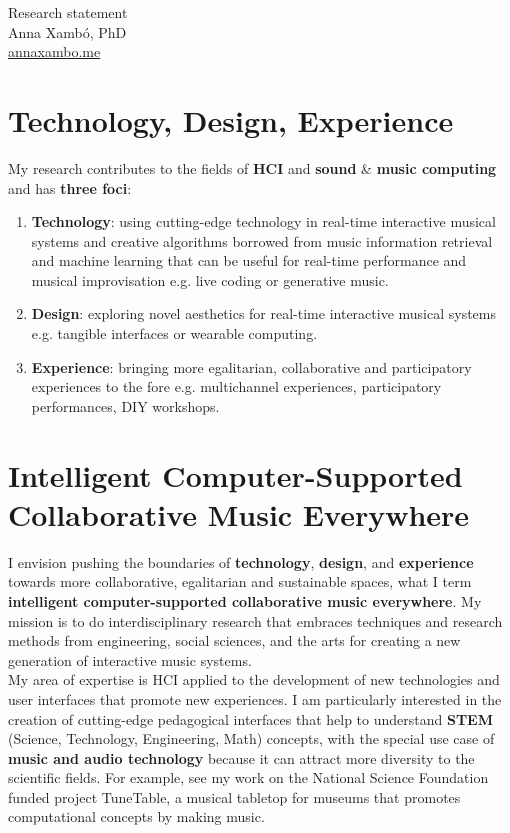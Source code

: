 \documentclass[10pt, a4paper]{article}
\begin{document}
{\LARGE Research statement}\\[0.2cm]
Anna Xambó, PhD\\
\href{http://annaxambo.me}{annaxambo.me}

\section*{Technology, Design, Experience}

My research contributes to the fields of \textbf{HCI} and \textbf{sound} \& \textbf{music computing} and has \textbf{three foci}:

\begin{enumerate}
\item \textbf{Technology}: using cutting-edge technology in real-time interactive musical systems and creative algorithms borrowed from music information retrieval and machine learning that can be useful for real-time performance and musical improvisation e.g. live coding or generative music.
\item \textbf{Design}: exploring novel aesthetics for real-time interactive musical systems e.g. tangible interfaces or wearable computing. 
\item \textbf{Experience}: bringing more egalitarian, collaborative and participatory experiences to the fore e.g. multichannel experiences, participatory performances, DIY workshops. 
\end{enumerate}

\section*{Intelligent Computer-Supported Collaborative Music Everywhere}

I envision pushing the boundaries of \textbf{technology}, \textbf{design}, and \textbf{experience} towards more collaborative, egalitarian and sustainable spaces, what I term \textbf{intelligent computer-supported collaborative music everywhere}. My mission is to do interdisciplinary research that embraces techniques and research methods from engineering, social sciences, and the arts for creating a new generation of interactive music systems.\\

My area of expertise is HCI applied to the development of new technologies and user interfaces that promote new experiences. I am particularly interested in the creation of cutting-edge pedagogical interfaces that help to understand \textbf{STEM} (Science, Technology, Engineering, Math) concepts, with the special use case of \textbf{music and audio technology} because it can attract more diversity to the scientific fields. For example, see my work on the National Science Foundation funded project TuneTable, a musical tabletop for museums that promotes computational concepts by making music.\\
\end{document}
